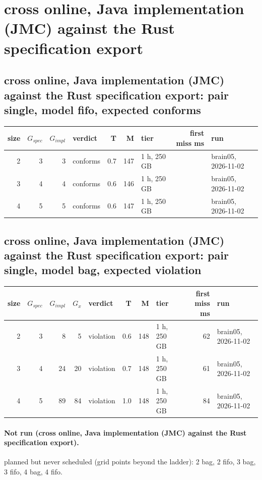 \documentclass[10pt]{article}
\begin{document}
\section*{cross online, Java implementation (JMC) against the Rust specification export}
\subsection*{cross online, Java implementation (JMC) against the Rust specification export: pair \textsf{single}, model fifo, expected conforms}
\begin{longtable}{@{}rrrlrrlrl@{}}
\toprule
size & $G_{\mathit{spec}}$ & $G_{\mathit{impl}}$ & verdict & T & M & tier & first miss ms & run \\
\midrule
\endhead
\color{red} 2 & 3 & 3 & conforms & 0.7 & 147 & 1 h, 250 GB &  & brain05, 2026-11-02 \\
\color{red} 3 & 4 & 4 & conforms & 0.6 & 146 & 1 h, 250 GB &  & brain05, 2026-11-02 \\
\color{red} 4 & 5 & 5 & conforms & 0.6 & 147 & 1 h, 250 GB &  & brain05, 2026-11-02 \\
\bottomrule
\end{longtable}
\subsection*{cross online, Java implementation (JMC) against the Rust specification export: pair \textsf{single}, model bag, expected violation}
\begin{longtable}{@{}rrrrlrrlrl@{}}
\toprule
size & $G_{\mathit{spec}}$ & $G_{\mathit{impl}}$ & $G_x$ & verdict & T & M & tier & first miss ms & run \\
\midrule
\endhead
\color{red} 2 & 3 & 8 & 5 & violation & 0.6 & 148 & 1 h, 250 GB & 62 & brain05, 2026-11-02 \\
\color{red} 3 & 4 & 24 & 20 & violation & 0.7 & 148 & 1 h, 250 GB & 61 & brain05, 2026-11-02 \\
\color{red} 4 & 5 & 89 & 84 & violation & 1.0 & 148 & 1 h, 250 GB & 84 & brain05, 2026-11-02 \\
\bottomrule
\end{longtable}
\paragraph{Not run (cross online, Java implementation (JMC) against the Rust specification export).}
planned but never scheduled (grid points beyond the ladder): 2 bag, 2 fifo, 3 bag, 3 fifo, 4 bag, 4 fifo.\par
\end{document}

